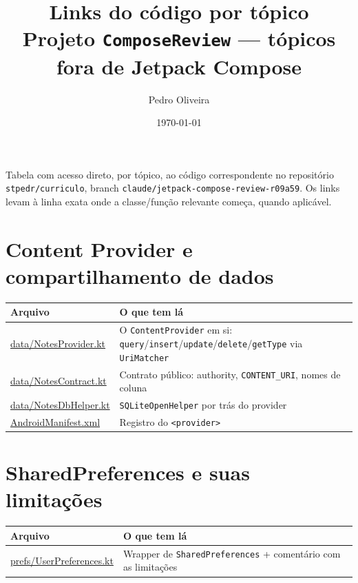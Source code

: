 \documentclass[11pt,a4paper]{article}
\title{\textbf{Links do código por tópico} \\ \large Projeto \texttt{ComposeReview} --- tópicos fora de Jetpack Compose}
\author{Pedro Oliveira}
\date{\today}
\newcommand{\repobase}{https://github.com/stpedr/curriculo/blob/claude/jetpack-compose-review-r09a59/jetpack-compose-review/}
\begin{document}

\maketitle

\noindent Tabela com acesso direto, por tópico, ao código correspondente
no repositório \texttt{stpedr/curriculo}, branch
\texttt{claude/jetpack-compose-review-r09a59}. Os links levam à linha
exata onde a classe/função relevante começa, quando aplicável.

\vspace{1em}

\section*{Content Provider e compartilhamento de dados}
\begin{longtable}{L{5.4cm}L{8.5cm}}
\textbf{Arquivo} & \textbf{O que tem lá} \\ \hline \endhead
\href{\repobase app/src/main/java/com/pedro/composereview/data/NotesProvider.kt\#L22}{\url{data/NotesProvider.kt}} &
O \texttt{ContentProvider} em si: \texttt{query}/\texttt{insert}/\texttt{update}/\texttt{delete}/\texttt{getType} via \texttt{UriMatcher} \\
\href{\repobase app/src/main/java/com/pedro/composereview/data/NotesContract.kt}{\url{data/NotesContract.kt}} &
Contrato público: authority, \texttt{CONTENT\_URI}, nomes de coluna \\
\href{\repobase app/src/main/java/com/pedro/composereview/data/NotesDbHelper.kt}{\url{data/NotesDbHelper.kt}} &
\texttt{SQLiteOpenHelper} por trás do provider \\
\href{\repobase app/src/main/AndroidManifest.xml}{\url{AndroidManifest.xml}} &
Registro do \texttt{<provider>} \\
\end{longtable}

\section*{SharedPreferences e suas limitações}
\begin{longtable}{L{5.4cm}L{8.5cm}}
\textbf{Arquivo} & \textbf{O que tem lá} \\ \hline \endhead
\href{\repobase app/src/main/java/com/pedro/composereview/prefs/UserPreferences.kt\#L29}{\url{prefs/UserPreferences.kt}} &
Wrapper de \texttt{SharedPreferences} + comentário com as limitações \\
\end{longtable}
\end{document}
